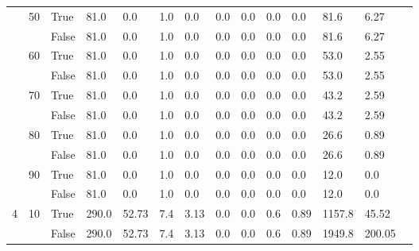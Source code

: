 \begin{landscape}
\begin{small}
\begin{longtable}[c]{@{}lll|ll|ll|ll|ll|lll@{}}
   & 50 & True  & 81.0            & 0.0            & 1.0           & 0.0           & 0.0           & 0.0           & 0.0           & 0.0           & 81.6          & 6.27        &  \\
   &    & False & 81.0            & 0.0            & 1.0           & 0.0           & 0.0           & 0.0           & 0.0           & 0.0           & 81.6          & 6.27        &  \\
   & 60 & True  & 81.0            & 0.0            & 1.0           & 0.0           & 0.0           & 0.0           & 0.0           & 0.0           & 53.0          & 2.55        &  \\
   &    & False & 81.0            & 0.0            & 1.0           & 0.0           & 0.0           & 0.0           & 0.0           & 0.0           & 53.0          & 2.55        &  \\
   & 70 & True  & 81.0            & 0.0            & 1.0           & 0.0           & 0.0           & 0.0           & 0.0           & 0.0           & 43.2          & 2.59        &  \\
   &    & False & 81.0            & 0.0            & 1.0           & 0.0           & 0.0           & 0.0           & 0.0           & 0.0           & 43.2          & 2.59        &  \\
   & 80 & True  & 81.0            & 0.0            & 1.0           & 0.0           & 0.0           & 0.0           & 0.0           & 0.0           & 26.6          & 0.89        &  \\
   &    & False & 81.0            & 0.0            & 1.0           & 0.0           & 0.0           & 0.0           & 0.0           & 0.0           & 26.6          & 0.89        &  \\
   & 90 & True  & 81.0            & 0.0            & 1.0           & 0.0           & 0.0           & 0.0           & 0.0           & 0.0           & 12.0          & 0.0         &  \\
   &    & False & 81.0            & 0.0            & 1.0           & 0.0           & 0.0           & 0.0           & 0.0           & 0.0           & 12.0          & 0.0         &  \\
  \midrule
4  & 10 & True  & 290.0           & 52.73          & 7.4           & 3.13          & 0.0           & 0.0           & 0.6           & 0.89          & 1157.8        & 45.52       &  \\
   &    & False & 290.0           & 52.73          & 7.4           & 3.13          & 0.0           & 0.0           & 0.6           & 0.89          & 1949.8        & 200.05      &  \\

\end{longtable}
\end{small}
\end{landscape}
